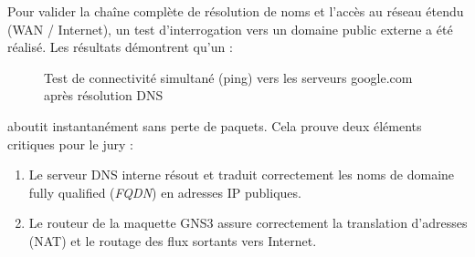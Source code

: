 Pour valider la chaîne complète de résolution de noms et l'accès au réseau étendu (WAN / Internet), un test d'interrogation vers un domaine public externe a été réalisé. Les résultats démontrent qu'un :
\begin{figure}[H]
    \centering
    \caption{Test de connectivité simultané (ping) vers les serveurs google.com après résolution DNS}
    \label{fig:test_dns_ping}
\end{figure}
aboutit instantanément sans perte de paquets. Cela prouve deux éléments critiques pour le jury :
\begin{enumerate}
    \item Le serveur DNS interne résout et traduit correctement les noms de domaine fully qualified (\textit{FQDN}) en adresses IP publiques.
    \item Le routeur de la maquette GNS3 assure correctement la translation d'adresses (NAT) et le routage des flux sortants vers Internet.
\end{enumerate}